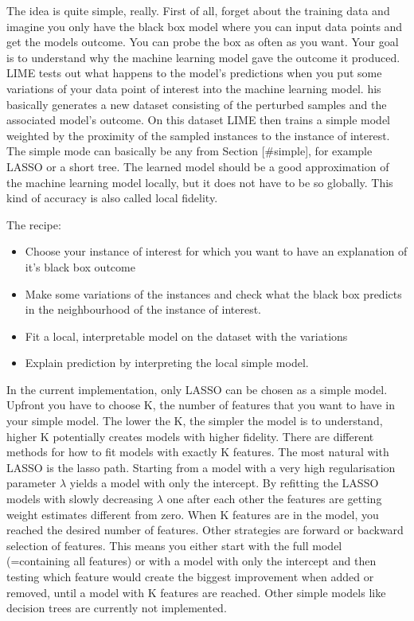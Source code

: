 \documentclass[12pt,]{krantz}
\providecommand{\tightlist}{%
  \setlength{\itemsep}{0pt}\setlength{\parskip}{0pt}}
\theoremstyle{definition}
\theoremstyle{definition}
\theoremstyle{definition}
\theoremstyle{remark}
\begin{document}
The idea is quite simple, really. First of all, forget about the
training data and imagine you only have the black box model where you
can input data points and get the models outcome. You can probe the box
as often as you want. Your goal is to understand why the machine
learning model gave the outcome it produced. LIME tests out what happens
to the model's predictions when you put some variations of your data
point of interest into the machine learning model. his basically
generates a new dataset consisting of the perturbed samples and the
associated model's outcome. On this dataset LIME then trains a simple
model weighted by the proximity of the sampled instances to the instance
of interest. The simple mode can basically be any from Section
{[}\#simple{]}, for example LASSO or a short tree. The learned model
should be a good approximation of the machine learning model locally,
but it does not have to be so globally. This kind of accuracy is also
called local fidelity.

The recipe:

\begin{itemize}
\tightlist
\item
  Choose your instance of interest for which you want to have an
  explanation of it's black box outcome
\item
  Make some variations of the instances and check what the black box
  predicts in the neighbourhood of the instance of interest.
\item
  Fit a local, interpretable model on the dataset with the variations
\item
  Explain prediction by interpreting the local simple model.
\end{itemize}

In the current implementation, only LASSO can be chosen as a simple
model. Upfront you have to choose K, the number of features that you
want to have in your simple model. The lower the K, the simpler the
model is to understand, higher K potentially creates models with higher
fidelity. There are different methods for how to fit models with exactly
K features. The most natural with LASSO is the lasso path. Starting from
a model with a very high regularisation parameter \(\lambda\) yields a
model with only the intercept. By refitting the LASSO models with slowly
decreasing \(\lambda\) one after each other the features are getting
weight estimates different from zero. When K features are in the model,
you reached the desired number of features. Other strategies are forward
or backward selection of features. This means you either start with the
full model (=containing all features) or with a model with only the
intercept and then testing which feature would create the biggest
improvement when added or removed, until a model with K features are
reached. Other simple models like decision trees are currently not
implemented.
\end{document}
